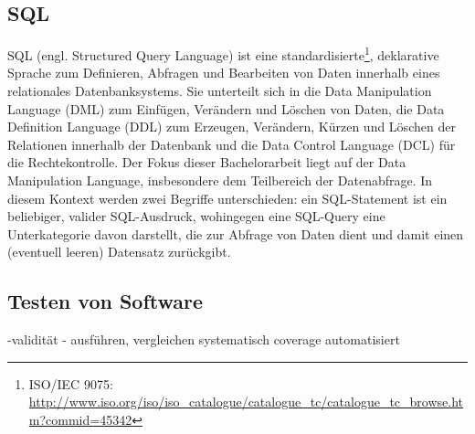 \subsection{SQL}
SQL (engl. Structured Query Language) \cite{DBLP:books/aw/DateD97} ist eine standardisierte\footnote{ISO/IEC 9075: \url{http://www.iso.org/iso/iso_catalogue/catalogue_tc/catalogue_tc_browse.htm?commid=45342}}, deklarative Sprache zum Definieren, Abfragen und Bearbeiten von Daten innerhalb eines relationales Datenbanksystems.
Sie unterteilt sich in die Data Manipulation Language (DML) zum Einfügen, Verändern und Löschen von Daten, die Data Definition Language (DDL) zum Erzeugen, Verändern, Kürzen und Löschen der Relationen innerhalb der Datenbank und die Data Control Language (DCL) für die Rechtekontrolle.
Der Fokus dieser Bachelorarbeit liegt auf der Data Manipulation Language, insbesondere dem Teilbereich der Datenabfrage.
In diesem Kontext werden zwei Begriffe unterschieden: ein SQL-Statement ist ein beliebiger, valider SQL-Ausdruck, wohingegen eine SQL-Query eine Unterkategorie davon darstellt, die zur Abfrage von Daten dient und damit einen (eventuell leeren) Datensatz zurückgibt.

\subsection{Testen von Software}
-validität
- ausführen, vergleichen
systematisch
coverage
automatisiert
